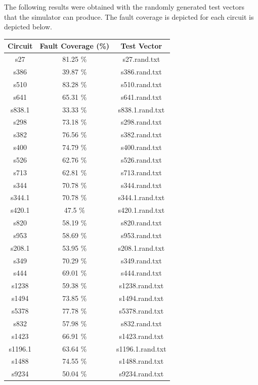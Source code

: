 \documentclass[a4paper,12pt]{article}
\begin{document}
The following results were obtained with the randomly generated test vectors that the simulator can produce. The fault coverage is depicted for each circuit is depicted below.

\begin{center}
\begin{tabular}{||c c c||}
\hline
Circuit & Fault Coverage (\%) & Test Vector \\ [0.5ex] 
\hline\hline
s27 & 81.25 \%  & s27.rand.txt \\ 
\hline
s386 & 39.87 \%  & s386.rand.txt \\ 
\hline
s510 & 83.28 \%  & s510.rand.txt \\ 
\hline
s641 & 65.31 \%  & s641.rand.txt \\ 
\hline
s838.1 & 33.33 \%  & s838.1.rand.txt \\ 
\hline
s298 & 73.18 \%  & s298.rand.txt \\ 
\hline
s382 & 76.56 \%  & s382.rand.txt \\ 
\hline
s400 & 74.79 \%  & s400.rand.txt \\ 
\hline
s526 & 62.76 \%  & s526.rand.txt \\ 
\hline
s713 & 62.81 \%  & s713.rand.txt \\ 
\hline
s344 & 70.78 \%  & s344.rand.txt \\ 
\hline
s344.1 & 70.78 \%  & s344.1.rand.txt \\ 
\hline
s420.1 & 47.5 \%  & s420.1.rand.txt \\ 
\hline
s820 & 58.19 \%  & s820.rand.txt \\ 
\hline
s953 & 58.69 \%  & s953.rand.txt \\ 
\hline
s208.1 & 53.95 \%  & s208.1.rand.txt \\ 
\hline
s349 & 70.29 \%  & s349.rand.txt \\ 
\hline
s444 & 69.01 \%  & s444.rand.txt \\ 
\hline
s1238 & 59.38 \%  & s1238.rand.txt \\ 
\hline
s1494 & 73.85 \%  & s1494.rand.txt \\ 
\hline
s5378 & 77.78 \%  & s5378.rand.txt \\ 
\hline
s832 & 57.98 \%  & s832.rand.txt \\ 
\hline
s1423 & 66.91 \%  & s1423.rand.txt \\ 
\hline
s1196.1 & 63.64 \%  & s1196.1.rand.txt \\ 
\hline
s1488 & 74.55 \%  & s1488.rand.txt \\ 
\hline
s9234 & 50.04 \%  & s9234.rand.txt \\ 

\end{tabular}
\end{center}
\end{document}
